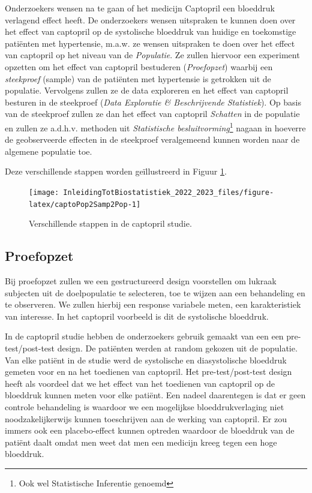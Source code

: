 \documentclass[
  12pt,dutch,coursenotes]{book}
\begin{document}
Onderzoekers wensen na te gaan of het medicijn Captopril een bloeddruk verlagend effect heeft.
De onderzoekers wensen uitspraken te kunnen doen over het effect van captopril op de systolische bloeddruk van huidige en toekomstige patiënten met hypertensie, m.a.w. ze wensen uitspraken te doen over het effect van captopril op het niveau van de \emph{Populatie}.
Ze zullen hiervoor een experiment opzetten om het effect van captopril bestuderen (\emph{Proefopzet}) waarbij een \emph{steekproef} (sample) van de patiënten met hypertensie is getrokken uit de populatie.
Vervolgens zullen ze de data exploreren en het effect van captopril besturen in de steekproef (\emph{Data Exploratie \& Beschrijvende Statistiek}). Op basis van de steekproef zullen ze dan het effect van captopril \emph{Schatten} in de populatie en zullen ze a.d.h.v. methoden uit \emph{Statistische besluitvorming}\footnote{Ook wel Statistische Inferentie genoemd} nagaan in hoeverre de geobserveerde effecten in de steekproef veralgemeend kunnen worden naar de algemene populatie toe.

Deze verschillende stappen worden geïllustreerd in Figuur \ref{fig:captoPop2Samp2Pop}.

\begin{figure}

{\centering \texttt{[image: InleidingTotBiostatistiek\_2022\_2023\_files/figure-latex/captoPop2Samp2Pop-1]} 

}

\caption{Verschillende stappen in de captopril studie.}\label{fig:captoPop2Samp2Pop}
\end{figure}

\hypertarget{proefopzet}{%
\subsection{Proefopzet}\label{proefopzet}}

Bij proefopzet zullen we een gestructureerd design voorstellen om lukraak subjecten uit de doelpopulatie
te selecteren, toe te wijzen aan een behandeling en te observeren.
We zullen hierbij een response variabele meten, een karakteristiek van interesse. In het captopril voorbeeld is dit de systolische bloeddruk.

In de captopril studie hebben de onderzoekers gebruik gemaakt van een een pre-test/post-test design.
De patiënten werden at random gekozen uit de populatie.
Van elke patiënt in de studie werd de systolische en diasystolische bloeddruk gemeten voor en na het toedienen van captopril.
Het pre-test/post-test design heeft als voordeel dat we het effect van het toedienen van captopril op de bloeddruk kunnen meten voor elke patiënt. Een nadeel daarentegen is dat er geen controle behandeling is waardoor we een mogelijkse bloeddrukverlaging niet noodzakelijkerwijs kunnen toeschrijven aan de werking van captopril. Er zou immers ook een placebo-effect kunnen optreden waardoor de bloeddruk van de patiënt daalt omdat men weet dat men een medicijn kreeg tegen een hoge bloeddruk.
\end{document}
